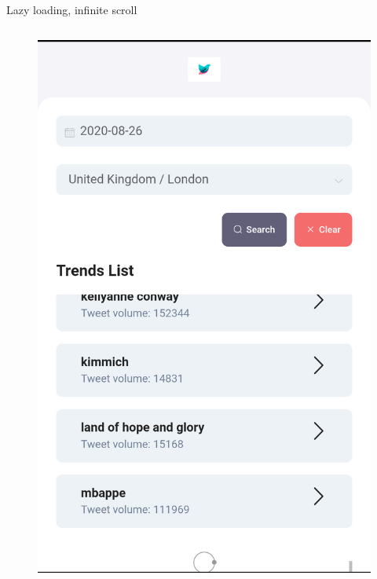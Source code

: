 \documentclass[xcolor=svgnames, aspectratio=169]{beamer}
\begin{document}
\begin{frame}{Lazy loading, infinite scroll}
\begin{columns}[t]
\begin{figure}[H]
            \includegraphics[width=0.475\paperwidth,height=0.7\paperheight,keepaspectratio]{Mobile_Chrome_Trends_list_Lazy_loading_Infinite_scroll.jpg}
        \end{figure}
    \end{columns}
\end{frame}

\end{document}
